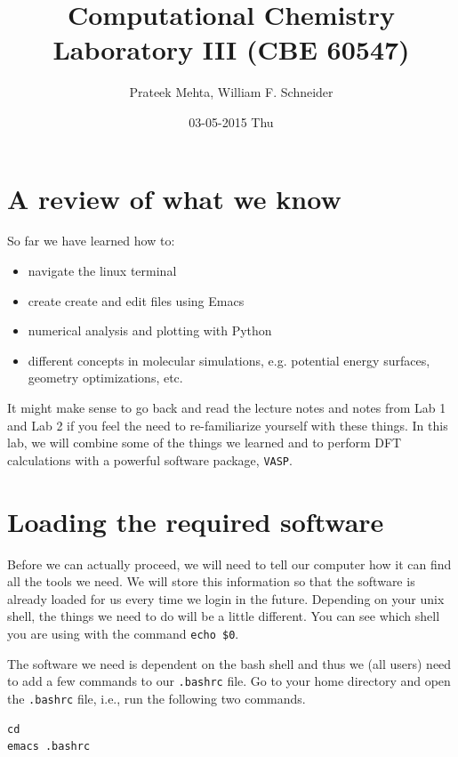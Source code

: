 \documentclass[11pt]{article}
\author{Prateek Mehta, William F. Schneider}
\date{03-05-2015 Thu}
\title{Computational Chemistry Laboratory III (CBE 60547)}
\begin{document}
\maketitle


\section{A review of what we know}
\label{sec-1}

So far we have learned how to:

\begin{itemize}
\item navigate the linux terminal

\item create create and edit files using Emacs

\item numerical analysis and plotting with Python

\item different concepts in molecular simulations, e.g. potential energy surfaces, geometry optimizations, etc.
\end{itemize}

It might make sense to go back and read the lecture notes and notes from Lab 1 and Lab 2 if you feel the need to re-familiarize yourself with these things. In this lab, we will combine some of the things we learned and to perform DFT calculations with a powerful software package, \texttt{VASP}. 


\section{Loading the required software}
\label{sec-2}

Before we can actually proceed, we will need to tell our computer how it can find all the tools we need. We will store this information so that the software is already loaded for us every time we login in the future. Depending on your unix shell, the things we need to do will be a little different. You can see which shell you are using with the command \verb~echo $0~. 

The software we need is dependent on the bash shell and thus we (all users) need to add a few commands to our \verb~.bashrc~ file. Go to your home directory and open the \texttt{.bashrc} file, i.e., run the following two commands. 

\begin{verbatim}
cd
emacs .bashrc
\end{verbatim}
\end{document}
